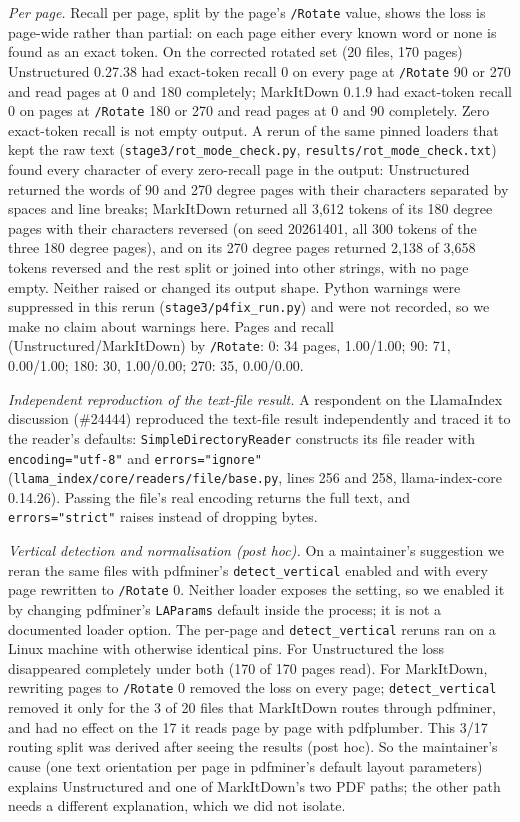\emph{Per page.} Recall per page, split by the page's \texttt{/Rotate} value, shows the loss is page-wide rather than partial: on each page either every known word or none is found as an exact token. On the corrected rotated set (20 files, 170 pages) Unstructured 0.27.38 had exact-token recall 0 on every page at \texttt{/Rotate} 90 or 270 and read pages at 0 and 180 completely; MarkItDown 0.1.9 had exact-token recall 0 on pages at \texttt{/Rotate} 180 or 270 and read pages at 0 and 90 completely. Zero exact-token recall is not empty output. A rerun of the same pinned loaders that kept the raw text (\texttt{stage3/rot\_mode\_check.py}, \texttt{results/rot\_mode\_check.txt}) found every character of every zero-recall page in the output: Unstructured returned the words of 90 and 270 degree pages with their characters separated by spaces and line breaks; MarkItDown returned all 3,612 tokens of its 180 degree pages with their characters reversed (on seed 20261401, all 300 tokens of the three 180 degree pages), and on its 270 degree pages returned 2,138 of 3,658 tokens reversed and the rest split or joined into other strings, with no page empty. Neither raised or changed its output shape. Python warnings were suppressed in this rerun (\texttt{stage3/p4fix\_run.py}) and were not recorded, so we make no claim about warnings here. Pages and recall (Unstructured/MarkItDown) by \texttt{/Rotate}: 0: 34 pages, 1.00/1.00; 90: 71, 0.00/1.00; 180: 30, 1.00/0.00; 270: 35, 0.00/0.00.

\emph{Independent reproduction of the text-file result.} A respondent on the LlamaIndex discussion (\#24444) reproduced the text-file result independently and traced it to the reader's defaults: \texttt{SimpleDirectoryReader} constructs its file reader with \texttt{encoding="utf-8"} and \texttt{errors="ignore"} (\texttt{llama\_index/core/readers/file/base.py}, lines 256 and 258, llama-index-core 0.14.26). Passing the file's real encoding returns the full text, and \texttt{errors="strict"} raises instead of dropping bytes.

\emph{Vertical detection and normalisation (post hoc).} On a maintainer's suggestion we reran the same files with pdfminer's \texttt{detect\_vertical} enabled and with every page rewritten to \texttt{/Rotate} 0. Neither loader exposes the setting, so we enabled it by changing pdfminer's \texttt{LAParams} default inside the process; it is not a documented loader option. The per-page and \texttt{detect\_vertical} reruns ran on a Linux machine with otherwise identical pins. For Unstructured the loss disappeared completely under both (170 of 170 pages read). For MarkItDown, rewriting pages to \texttt{/Rotate} 0 removed the loss on every page; \texttt{detect\_vertical} removed it only for the 3 of 20 files that MarkItDown routes through pdfminer, and had no effect on the 17 it reads page by page with pdfplumber. This 3/17 routing split was derived after seeing the results (post hoc). So the maintainer's cause (one text orientation per page in pdfminer's default layout parameters) explains Unstructured and one of MarkItDown's two PDF paths; the other path needs a different explanation, which we did not isolate.

